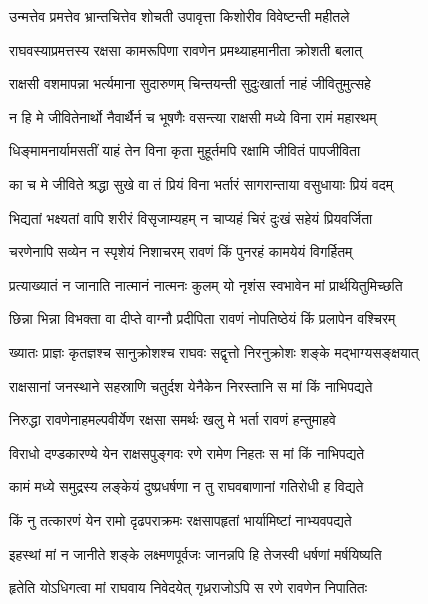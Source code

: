 \twolineshloka
{उन्मत्तेव प्रमत्तेव भ्रान्तचित्तेव शोचती}
{उपावृत्ता किशोरीव विवेष्टन्ती महीतले} %

\twolineshloka
{राघवस्याप्रमत्तस्य रक्षसा कामरूपिणा}
{रावणेन प्रमथ्याहमानीता क्रोशती बलात्} %

\twolineshloka
{राक्षसी वशमापन्ना भर्त्यमाना सुदारुणम्}
{चिन्तयन्ती सुदुःखार्ता नाहं जीवितुमुत्सहे} %

\twolineshloka
{न हि मे जीवितेनार्थो नैवार्थैर्न च भूषणैः}
{वसन्त्या राक्षसी मध्ये विना रामं महारथम्} %

\twolineshloka
{धिङ्मामनार्यामसतीं याहं तेन विना कृता}
{मुहूर्तमपि रक्षामि जीवितं पापजीविता} %

\twolineshloka
{का च मे जीविते श्रद्धा सुखे वा तं प्रियं विना}
{भर्तारं सागरान्ताया वसुधायाः प्रियं वदम्} %

\twolineshloka
{भिद्यतां भक्ष्यतां वापि शरीरं विसृजाम्यहम्}
{न चाप्यहं चिरं दुःखं सहेयं प्रियवर्जिता} %

\twolineshloka
{चरणेनापि सव्येन न स्पृशेयं निशाचरम्}
{रावणं किं पुनरहं कामयेयं विगर्हितम्} %

\twolineshloka
{प्रत्याख्यातं न जानाति नात्मानं नात्मनः कुलम्}
{यो नृशंस स्वभावेन मां प्रार्थयितुमिच्छति} %

\twolineshloka
{छिन्ना भिन्ना विभक्ता वा दीप्ते वाग्नौ प्रदीपिता}
{रावणं नोपतिष्ठेयं किं प्रलापेन वश्चिरम्} %

\twolineshloka
{ख्यातः प्राज्ञः कृतज्ञश्च सानुक्रोशश्च राघवः}
{सद्वृत्तो निरनुक्रोशः शङ्के मद्भाग्यसङ्क्षयात्} %

\twolineshloka
{राक्षसानां जनस्थाने सहस्राणि चतुर्दश}
{येनैकेन निरस्तानि स मां किं नाभिपद्यते} %

\twolineshloka
{निरुद्धा रावणेनाहमल्पवीर्येण रक्षसा}
{समर्थः खलु मे भर्ता रावणं हन्तुमाहवे} %

\twolineshloka
{विराधो दण्डकारण्ये येन राक्षसपुङ्गवः}
{रणे रामेण निहतः स मां किं नाभिपद्यते} %

\twolineshloka
{कामं मध्ये समुद्रस्य लङ्केयं दुष्प्रधर्षणा}
{न तु राघवबाणानां गतिरोधी ह विद्यते} %

\twolineshloka
{किं नु तत्कारणं येन रामो दृढपराक्रमः}
{रक्षसापहृतां भार्यामिष्टां नाभ्यवपद्यते} %

\twolineshloka
{इहस्थां मां न जानीते शङ्के लक्ष्मणपूर्वजः}
{जानन्नपि हि तेजस्वी धर्षणां मर्षयिष्यति} %

\twolineshloka
{हृतेति योऽधिगत्वा मां राघवाय निवेदयेत्}
{गृध्रराजोऽपि स रणे रावणेन निपातितः} %

